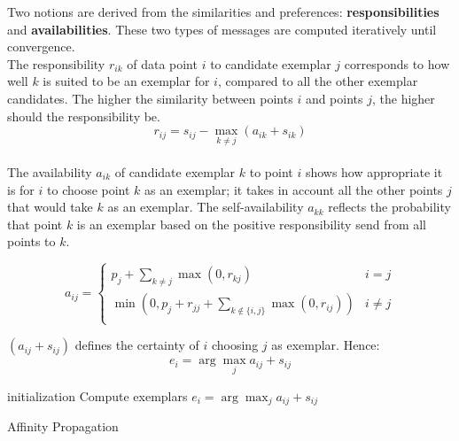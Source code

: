\documentclass{ipol}
\begin{document}
Two notions are derived from the similarities and preferences:
\textbf{responsibilities} and \textbf{availabilities}. These two types of
messages are computed iteratively until convergence.
\\
The responsibility $r_{ik}$ of data point $i$ to
candidate exemplar $j$ corresponds to how well $k$ is suited to be an exemplar
for $i$, compared to all the other exemplar candidates. The higher the
similarity between points $i$ and points $j$, the higher should the
responsibility be.
\begin{equation*}
r_{ij} = s_{ij} - \max_{k \neq j} (a_{ik} + s_{ik})
\end{equation*}
\\
The availability $a_{ik}$ of candidate exemplar $k$ to point $i$ shows how
appropriate it is for $i$ to choose point $k$ as an exemplar; it takes in account
all the other points $j$ that would take $k$ as an exemplar. The
self-availability $a_{kk}$ reflects the probability that point $k$ is an
exemplar based on the positive responsibility send from all points to $k$.

\begin{equation*}
a_{ij} = \begin{cases}
	    p_j + \sum_{k \neq j} \max(0, r_{kj}) &  i = j \\
	    \min ( 0, p_j + r_{jj} + \sum_{k \notin \{i, j\} } \max (0, r_{ij}))
	    & i \neq j\\
	 \end{cases}
\end{equation*}

$(a_{ij} + s_{ij})$ defines the certainty of $i$ choosing $j$ as exemplar.
Hence:
\begin{equation*}
e_i = \arg \max_j a_{ij} + s_{ij}
\end{equation*}

\begin{algorithm}[h]
  \SetLine
  initialization\;
  Compute exemplars $e_i = \arg \max_{j} a_{ij} + s_{ij}$ \;
  \caption{Affinity Propagation}
\end{algorithm}
\end{document}
